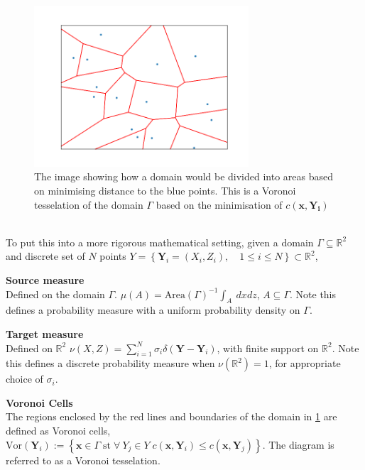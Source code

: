 \begin{figure}[h]
	\centering
	\includegraphics[width=8cm]{project/laguerre_diagram_0w}
	\caption[The partitioning of a Domain]{The image showing how a domain would be divided into areas based on minimising distance to the blue points. This is a Voronoi tesselation of the domain $\Gamma$ based on the minimisation of $c(\bm{x},\bm{Y_i})$}
	\label{fig:laguerrediagram0w}
\end{figure}
\\
To put this into a more rigorous mathematical setting, given a domain  $\Gamma\subseteq \mathbb{R}^2$ and discrete set of $N$ points $Y = \left\lbrace \bm{Y}_i = (X_i,Z_i), \quad 1\leq i \leq N \right\rbrace  \subset \mathbb{R}^2$,
\begin{definition}
	\textbf{Source measure} \\ Defined on the domain $\Gamma$. $\mu(A) = \textrm{Area}(\Gamma)^{-1}\int_A \ dxdz$, $A \subseteq \Gamma$. Note this defines a probability measure with a uniform probability density on $\Gamma$.
\end{definition}
\begin{definition}
	\textbf{Target measure} \\Defined on $\mathbb{R}^2$ $\nu(X,Z) = \sum_{i=1}^{N}\sigma_i \delta\left(\bm{Y}-\bm{Y}_i\right)$, with finite support on $\mathbb{R}^2$. Note this defines a discrete probability measure when $\nu(\mathbb{R}^2) = 1$, for appropriate choice of $\sigma_i$.
	\label{target measure}
\end{definition}
\begin{definition}
	\textbf{Voronoi Cells} \\ The regions enclosed by the red lines and boundaries of the domain in \ref{fig:laguerrediagram0w} are defined as Voronoi cells, $\text{Vor}(\bm{Y}_i) := \left\lbrace \bm{x} \in \Gamma \; \text{st} \; \forall \ Y_j \in Y \; c(\bm{x},\bm{Y}_i) \leq c(\bm{x},\bm{Y}_j) \right\rbrace$. The diagram is referred to as a Voronoi tesselation.
\end{definition} 

